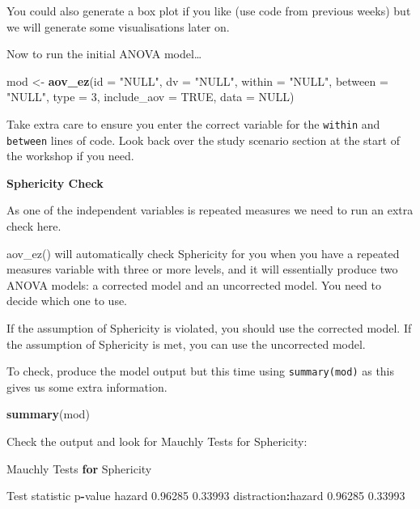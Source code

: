 \documentclass[
]{book}
\newenvironment{Shaded}{\begin{snugshade}}{\end{snugshade}}
\newcommand{\AttributeTok}[1]{\textcolor[rgb]{0.13,0.29,0.53}{#1}}
\newcommand{\ConstantTok}[1]{\textcolor[rgb]{0.56,0.35,0.01}{#1}}
\newcommand{\ControlFlowTok}[1]{\textcolor[rgb]{0.13,0.29,0.53}{\textbf{#1}}}
\newcommand{\DecValTok}[1]{\textcolor[rgb]{0.00,0.00,0.81}{#1}}
\newcommand{\FloatTok}[1]{\textcolor[rgb]{0.00,0.00,0.81}{#1}}
\newcommand{\FunctionTok}[1]{\textcolor[rgb]{0.13,0.29,0.53}{\textbf{#1}}}
\newcommand{\NormalTok}[1]{#1}
\newcommand{\OtherTok}[1]{\textcolor[rgb]{0.56,0.35,0.01}{#1}}
\newcommand{\SpecialCharTok}[1]{\textcolor[rgb]{0.81,0.36,0.00}{\textbf{#1}}}
\newcommand{\StringTok}[1]{\textcolor[rgb]{0.31,0.60,0.02}{#1}}
\begin{document}
You could also generate a box plot if you like (use code from previous weeks) but we will generate some visualisations later on.

Now to run the initial ANOVA model\ldots{}

\begin{Shaded}
\begin{Highlighting}[]
\NormalTok{mod }\OtherTok{\textless{}{-}} \FunctionTok{aov\_ez}\NormalTok{(}\AttributeTok{id =} \StringTok{"NULL"}\NormalTok{,}
              \AttributeTok{dv =} \StringTok{"NULL"}\NormalTok{,}
              \AttributeTok{within =} \StringTok{"NULL"}\NormalTok{,}
              \AttributeTok{between =} \StringTok{"NULL"}\NormalTok{,}
              \AttributeTok{type =} \DecValTok{3}\NormalTok{,}
              \AttributeTok{include\_aov =} \ConstantTok{TRUE}\NormalTok{,}
              \AttributeTok{data =} \ConstantTok{NULL}\NormalTok{)}
\end{Highlighting}
\end{Shaded}

Take extra care to ensure you enter the correct variable for the \texttt{within} and \texttt{between} lines of code. Look back over the study scenario section at the start of the workshop if you need.

\textbf{Sphericity Check}

As one of the independent variables is repeated measures we need to run an extra check here.

aov\_ez() will automatically check Sphericity for you when you have a repeated measures variable with three or more levels, and it will essentially produce two ANOVA models: a corrected model and an uncorrected model. You need to decide which one to use.

If the assumption of Sphericity is violated, you should use the corrected model.
If the assumption of Sphericity is met, you can use the uncorrected model.

To check, produce the model output but this time using \texttt{summary(mod)} as this gives us some extra information.

\begin{Shaded}
\begin{Highlighting}[]
\FunctionTok{summary}\NormalTok{(mod)}
\end{Highlighting}
\end{Shaded}

Check the output and look for Mauchly Tests for Sphericity:

\begin{Shaded}
\begin{Highlighting}[]
\NormalTok{Mauchly Tests }\ControlFlowTok{for}\NormalTok{ Sphericity}

\NormalTok{                   Test statistic p}\SpecialCharTok{{-}}\NormalTok{value}
\NormalTok{hazard                    }\FloatTok{0.96285} \FloatTok{0.33993}
\NormalTok{distraction}\SpecialCharTok{:}\NormalTok{hazard        }\FloatTok{0.96285} \FloatTok{0.33993}
\end{Highlighting}
\end{Shaded}
\end{document}
